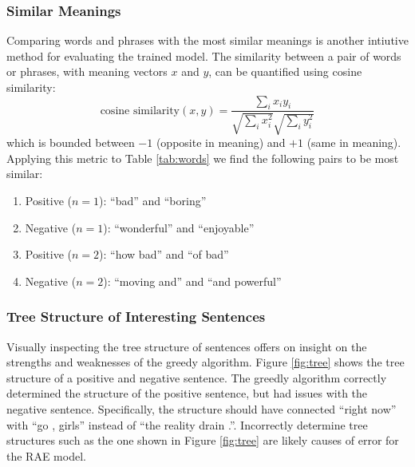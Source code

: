 \documentclass{article}
\begin{document}
\subsubsection{Similar Meanings}
Comparing words and phrases with the most similar meanings is another intiutive method for evaluating the trained model. The similarity between a pair of words or phrases, with meaning vectors $x$ and $y$, can be quantified using cosine similarity:
\begin{equation}
    \textrm{cosine similarity} (x, y) = \frac{\sum_i x_i y_i}{\sqrt{\sum_i x_i^2} \sqrt{\sum_i y_i^2}}
\end{equation}
which is bounded between $-1$ (opposite in meaning) and $+1$ (same in meaning). Applying this metric to Table \ref{tab:words} we find the following pairs to be most similar:
\begin{enumerate}
    \item Positive ($n=1$): ``bad'' and ``boring''
    \item Negative ($n=1$): ``wonderful'' and ``enjoyable''
    \item Positive ($n=2$): ``how bad'' and ``of bad''
    \item Negative ($n=2$): ``moving and'' and ``and powerful''
\end{enumerate}


\subsubsection{Tree Structure of Interesting Sentences}
Visually inspecting the tree structure of sentences offers on insight on the strengths and weaknesses of the greedy algorithm. Figure \ref{fig:tree} shows the tree structure of a positive and negative sentence. The greedly algorithm correctly determined the structure of the positive sentence, but had issues with the negative sentence. Specifically, the structure should have connected ``right now'' with ``go , girls'' instead of ``the reality drain .''. Incorrectly determine tree structures such as the one shown in Figure \ref{fig:tree} are likely causes of error for the RAE model.
\end{document}
